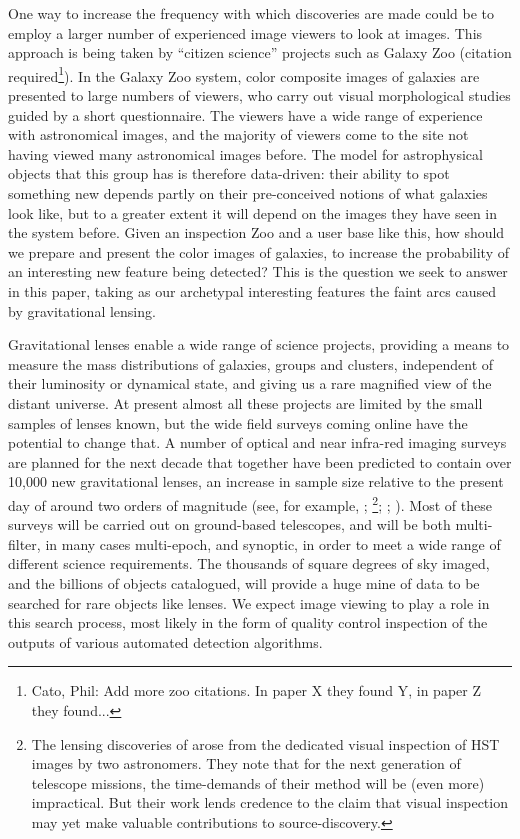 \documentclass[letterpaper, 11pt]{article}
\def\HST{HST\xspace}
\begin{document}
One way to increase the frequency with which discoveries are made  could be to
employ a larger number of experienced image viewers to look at images.  This
approach is being taken by ``citizen science'' projects such as Galaxy Zoo
(citation required\footnote{Cato, Phil: Add more zoo citations. In paper X they
found Y, in paper Z they found...}). In the Galaxy Zoo system, color composite
images of galaxies are presented to large numbers of viewers, who carry out
visual morphological studies guided by a short questionnaire. The viewers have
a wide range of experience with astronomical images, and the majority of
viewers come to the site not having viewed many astronomical images before.
The model for astrophysical objects that this group has is therefore
data-driven: their ability to spot something new depends partly on their
pre-conceived notions of what galaxies look like, but to a greater extent it
will depend on the images they have seen in the system before. Given an
inspection Zoo and a user base like this,  how should we prepare and present
the color images of galaxies, to increase the probability of an interesting
new feature being detected? This is the question we seek to answer in this
paper, taking as our archetypal interesting features the faint arcs caused by
gravitational lensing. 

Gravitational lenses enable a wide range of science projects, providing a
means to measure the mass distributions of  galaxies, groups and clusters,
independent of their luminosity or dynamical state, and giving us a rare
magnified view of the distant universe. At present almost all these projects
are limited by the small samples of lenses known, but the wide field surveys
coming online have the potential to change that. A number of optical and near
infra-red imaging surveys are planned for the next decade that together have
been predicted to contain over 10,000 new gravitational lenses, an increase in
sample size relative to the present day of around two orders of magnitude
(see, for example, \citet{O+M10}; \citet{Paw++12}\footnote{The lensing discoveries of \citet{Paw++12} arose from the dedicated visual inspection of \HST images by two astronomers. They note that for the next generation of telescope missions, the time-demands of their method will be (even more) impractical. But their work lends credence to the claim that visual inspection may yet make valuable contributions to source-discovery.}; \citet[chapter 12]{LSST09}; \citet[chapter 1, page 8]{ERB10}). Most of these
surveys will be carried out on ground-based telescopes, and will be both
multi-filter, in many cases multi-epoch, and synoptic, in order to meet a wide
range of different science requirements. The thousands of square degrees of
sky imaged, and the billions of objects catalogued, will provide a huge mine
of data to be searched for rare objects like lenses. We expect image viewing
to play a role in this search process, most likely in the form of quality
control inspection of the outputs of various automated detection algorithms.
\end{document}
